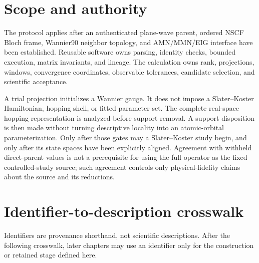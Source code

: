 \documentclass[11pt]{report}
\begin{document}
\chapter{Scope and authority}

The protocol applies after an authenticated plane-wave parent, ordered NSCF Bloch frame,
Wannier90 neighbor topology, and AMN/MMN/EIG interface have been established.  Reusable
software owns parsing, identity checks, bounded execution, matrix invariants, and lineage.
The calculation owns rank, projections, windows, convergence coordinates, observable
tolerances, candidate selection, and scientific acceptance.

A trial projection initializes a Wannier gauge.  It does not impose a Slater--Koster
Hamiltonian, hopping shell, or fitted parameter set.  The complete real-space hopping
representation is analyzed before support removal.  A support disposition is then made
without turning descriptive locality into an atomic-orbital parameterization.  Only
after those gates may a Slater--Koster study begin, and only after its state spaces have
been explicitly aligned.  Agreement with withheld direct-parent values is not a
prerequisite for using the full operator as the fixed controlled-study source; such
agreement controls only physical-fidelity claims about the source and its reductions.

\chapter{Identifier-to-description crosswalk}

Identifiers are provenance shorthand, not scientific descriptions.  After the following
crosswalk, later chapters may use an identifier only for the construction or retained
stage defined here.
\end{document}
